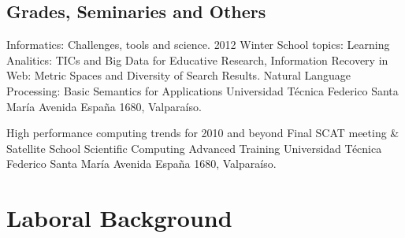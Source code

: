 \documentclass[11pt,letterpaper,roman]{moderncv}
\begin{document}
\subsection{Grades, Seminaries and Others}

	{Informatics: Challenges, tools and science.}
	{2012 Winter School}
	{topics: Learning Analitics: TICs and Big Data for Educative Research, Information Recovery in Web: Metric Spaces and Diversity of Search Results. Natural Language Processing: Basic Semantics for Applications }
	{Universidad T\'ecnica Federico Santa Mar\'ia}
	{Avenida España 1680, Valpara\'iso.}
	
	
	{High performance computing trends for 2010 and beyond}
	{Final SCAT meeting \& Satellite School}
	{Scientific Computing Advanced Training}
	{Universidad T\'ecnica Federico Santa Mar\'ia}
	{Avenida España 1680, Valpara\'iso.}


\section{Laboral Background}

\newcommand{\ingennia}{\textsc{Ingennia SpA}\xspace}

\newcommand{\multicaja}{\textsc{Multicaja SA}\xspace}
\newcommand{\multipay}{\href{http://www.multipay.cl}{Multipay}\xspace}

\newcommand{\ikom}{\textsc{Ikom SA}\xspace}

\newcommand{\jobbitgames}{\textsc{JobbitGames SA}\xspace}
\newcommand{\LET}{\href{www.let.cl}{LET}}

\newcommand{\paonde}{\textsc{PaOnde SA}\xspace}
\newcommand{\paondeandroid}{\href{www.paonde.com}{paOnde Android}}

\newcommand{\mataveri}{\textsc{Mataveri Ltda}\xspace}
\newcommand{\freetouchchile}{\href{https://play.google.com/store/apps/details?id=cl.freetouch}{Freetouch
Chile}\xspace}
\newcommand{\freetouchperu}{\href{https://play.google.com/store/apps/details?id=pe.freetouch}{Freetouch
Peru}\xspace}

\newcommand{\placetribe}{\textsc{Placetribe SpA}\xspace}
\newcommand{\placetribeapp}{\href{http://www.placetribe.com}{Placetribe App}\xspace}

\newcommand{\ipgamma}{\textsc{Instituto Profesional de Electronica Gamma}\xspace}
\newcommand{\otecnewline}{\textsc{New Line Capacitación}\xspace}
\newcommand{\ernestoquiroz}{\textsc{Escuela Ernesto Quir\'oz Weber}\xspace}
\end{document}
